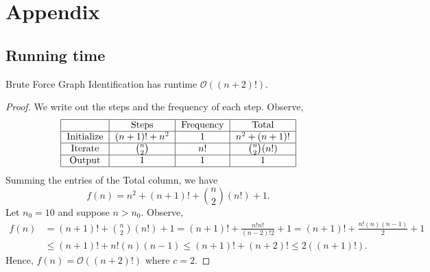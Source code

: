 \section{Appendix}
\subsection{Running time}
\begin{theorem}
	Brute Force Graph Identification has runtime $\mathcal{O}((n+2)!)$.
\end{theorem}
\begin{proof}
	We write out the steps and the frequency of each step. Observe,
	\[\begin{tabular}{|c|c|c|c|}
		\hline
		& Steps&Frequency&Total\\
		\hline
		Initialize&$(n+1)!+n^2$&1&$n^2+(n+1)!$\\
		\hline
		Iterate&${n\choose 2}$&$n!$&${n\choose2}(n!)$\\
		\hline
		Output&1&1&1\\
		\hline
	\end{tabular}\]
	Summing the entries of the Total column, we have\[f(n)=n^2+(n+1)!+{n\choose2}(n!)+1.\]
	Let $n_0=10$ and suppose $n>n_0$. Observe,
	\begin{align*}
		f(n)&=(n+1)!+{n\choose2}(n!)+1=(n+1)!+\frac{n!n!}{(n-2)!2}+1=(n+1)!+\frac{n!(n)(n-1)}{2}+1\\
		&\le(n+1)!+n!(n)(n-1)\le(n+1)!+(n+2)!\le2((n+1)!).
	\end{align*}
	Hence, $f(n)=\mathcal{O}((n+2)!)$ where $c=2$.
\end{proof}
